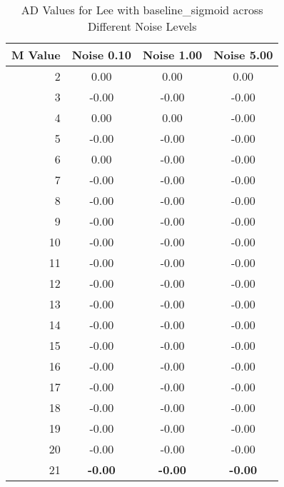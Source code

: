     \begin{table}[htb]
       \small

    \centering 
    \begin{tabular}{|r|ccc|}\hline
   M Value &  Noise 0.10 &  Noise 1.00 &  Noise 5.00 \\ \hline 
      2 &  0.00 &  0.00 &  0.00  \\ \hline 
      3 &  -0.00 &  -0.00 &  -0.00  \\ \hline 
      4 &  0.00 &  0.00 &  -0.00  \\ \hline 
      5 &  -0.00 &  -0.00 &  -0.00  \\ \hline 
      6 &  0.00 &  -0.00 &  -0.00  \\ \hline 
      7 &  -0.00 &  -0.00 &  -0.00  \\ \hline 
      8 &  -0.00 &  -0.00 &  -0.00  \\ \hline 
      9 &  -0.00 &  -0.00 &  -0.00  \\ \hline 
      10 &  -0.00 &  -0.00 &  -0.00  \\ \hline 
      11 &  -0.00 &  -0.00 &  -0.00  \\ \hline 
      12 &  -0.00 &  -0.00 &  -0.00  \\ \hline 
      13 &  -0.00 &  -0.00 &  -0.00  \\ \hline 
      14 &  -0.00 &  -0.00 &  -0.00  \\ \hline 
      15 &  -0.00 &  -0.00 &  -0.00  \\ \hline 
      16 &  -0.00 &  -0.00 &  -0.00  \\ \hline 
      17 &  -0.00 &  -0.00 &  -0.00  \\ \hline 
      18 &  -0.00 &  -0.00 &  -0.00  \\ \hline 
      19 &  -0.00 &  -0.00 &  -0.00  \\ \hline 
      20 &  -0.00 &  -0.00 &  -0.00  \\ \hline 
      21 &  \textbf{-0.00} &  \textbf{-0.00} &  \textbf{-0.00}  \\ \hline 
    \end{tabular}
    \caption{AD Values for Lee with baseline_sigmoid across Different Noise Levels}
    \end{table}



